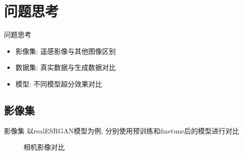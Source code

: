 \section{问题思考}

\begin{frame}{问题思考}
    \begin{itemize}
        \item 影像集: 遥感影像与其他图像区别
        \item 数据集: 真实数据与生成数据对比
        \item 模型: 不同模型超分效果对比
    \end{itemize}
\end{frame}

\subsection{影像集}
\begin{frame}{影像集}
    以realESRGAN模型为例, 分别使用预训练和finetune后的模型进行对比

    \begin{figure}[!htbp]
        \centering
        
        \caption{相机影像对比}
        \label{fig:0201}
    \end{figure}
\end{frame}

